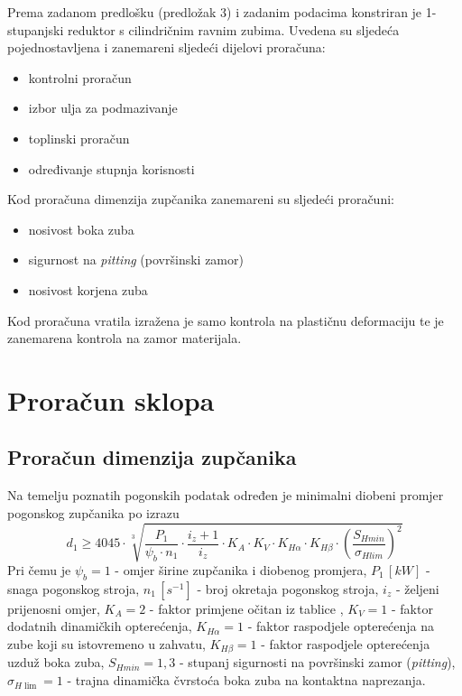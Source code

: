 \documentclass[11pt,a4paper]{report}
\begin{document}
Prema zadanom predlošku (predložak 3) i zadanim podacima konstriran je 1-stupanjski reduktor s cilindričnim ravnim zubima.
Uvedena su sljedeća pojednostavljena i zanemareni sljedeći dijelovi proračuna:
\begin{itemize}
\item kontrolni proračun
\item izbor ulja za podmazivanje
\item toplinski proračun
\item određivanje stupnja korisnosti
\end{itemize}
Kod proračuna dimenzija zupčanika zanemareni su sljedeći proračuni:
\begin{itemize}
\item nosivost boka zuba
\item sigurnost na \textit{pitting} (površinski zamor)
\item nosivost korjena zuba
\end{itemize}
Kod proračuna vratila izražena je samo kontrola na plastičnu deformaciju te je zanemarena kontrola na zamor materijala.

\chapter{Proračun sklopa}
\section{Proračun dimenzija zupčanika}
Na temelju poznatih pogonskih podatak određen je minimalni diobeni promjer pogonskog zupčanika po izrazu
\begin{equation}
d_1\geq 4045 \cdot \sqrt[3]{\frac{P_1}{\psi_b \cdot n_1} \cdot \frac{i_z +1}{i_z}\cdot K_A \cdot 
K_V \cdot K_{H\alpha} \cdot K_{H\beta} \cdot \left(\frac{S_{Hmin}}{\sigma_{Hlim}}\right)^2 }\label{equ:d1minimalno}
\end{equation}
Pri čemu je $\psi_b=1$ - omjer širine zupčanika i diobenog promjera,
$P_1 \, [kW]$ - snaga pogonskog stroja,
$n_1 \, [s^{-1}]$ - broj okretaja pogonskog stroja,
$i_z$ - željeni prijenosni omjer,
$K_A=2$ - faktor primjene očitan iz tablice \cite{potrebniMaterijali},
$K_V=1$ - faktor dodatnih dinamičkih opterećenja,
$K_{H\alpha}=1$ - faktor raspodjele opterećenja na zube koji su istovremeno u zahvatu,
$K_{H\beta}=1$ - faktor raspodjele opterećenja uzduž boka zuba,
$S_{Hmin}=1,3$ - stupanj sigurnosti na površinski zamor (\textit{pitting}),
$\sigma_{H\lim}=1$ - trajna dinamička čvrstoća boka zuba na kontaktna naprezanja.
\end{document}
